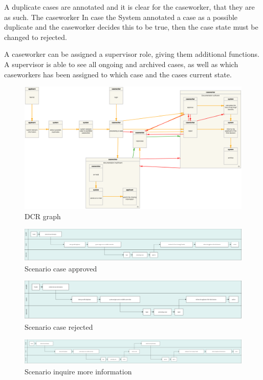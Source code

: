 \vspace{2mm}

A duplicate cases are annotated and it is clear for the caseworker, that they are as such. The caseworker   In case the System annotated a case as a possible duplicate and the caseworker decides this to be true, then the case state must be changed to rejected.

\vspace{2mm}

A caseworker can be assigned a supervisor role, giving them additional functions. A supervisor is able to see all ongoing and archived cases, as well as which caseworkers has been assigned to which case and the cases current state.
\newpage
\begin{figure}[htb!]
	\includegraphics[width=\textwidth]{dcrgraph/dcrgraph.png}
	\caption{DCR graph}
\end{figure}

\newpage
\begin{figure}[htb!]
    \centering
    \includegraphics[width=\textwidth]{dcrgraph/case-approved.png}
    \caption{Scenario case approved}
\end{figure}

\begin{figure}[htb!]
    \centering
    \includegraphics[width=\textwidth]{dcrgraph/case-rejected.png}
    \caption{Scenario case rejected}
\end{figure}

\begin{figure}[htb!]
    \centering
    \includegraphics[width=\textwidth]{dcrgraph/case-inquire-information.png}
    \caption{Scenario inquire more information}
\end{figure}
